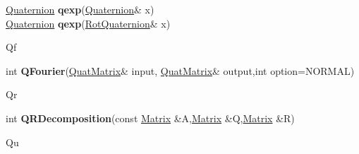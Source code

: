 \documentclass[10pt,titlepage]{article}
\def\functionlistentry#1#2#3#4#5#6{\noindent #1 {\bf #2}(#3) \dotfill #6\\}
\def\letterref#1{}
\def\letterlabel#1{\vspace{0.5cm}\centerline{\Large #1}}
\def\letterlabelend#1{}
\begin{document}
{{\letterref{Qe}
\letterref{Qf}
\letterref{Qr}
\letterref{Qu}
\letterlabelend{Qe}
\functionlistentry{\hyperlink{Quaternion}{Quaternion}}{qexp}{\hyperlink{Quaternion}{Quaternion}\& x}{1477}{quaternions}{}
\functionlistentry{\hyperlink{Quaternion}{Quaternion}}{qexp}{\hyperlink{RotQuaternion}{RotQuaternion}\& x}{1501}{quaternions}{}

\letterlabel{Qf}
\letterref{A}
\letterref{B}
\letterref{C}
\letterref{D}
\letterref{E}
\letterref{F}
\letterref{G}
\letterref{H}
\letterref{I}
\letterref{K}
\letterref{L}
\letterref{M}
\letterref{N}
\letterref{O}
\letterref{P}
\letterref{Q}
\letterref{R}
\letterref{S}
\letterref{T}
\letterref{U}
\letterref{V}
\letterref{W}
\letterref{X}
\letterref{Y}
\letterref{Z}

\letterref{Qe}
\letterref{Qf}
\letterref{Qr}
\letterref{Qu}
\letterlabelend{Qf}
\functionlistentry{int}{QFourier}{\hyperlink{QuatMatrix}{QuatMatrix}\& input, \hyperlink{QuatMatrix}{QuatMatrix}\& output,int option=NORMAL}{1540}{quaternions}{}

\letterlabel{Qr}
\letterref{A}
\letterref{B}
\letterref{C}
\letterref{D}
\letterref{E}
\letterref{F}
\letterref{G}
\letterref{H}
\letterref{I}
\letterref{K}
\letterref{L}
\letterref{M}
\letterref{N}
\letterref{O}
\letterref{P}
\letterref{Q}
\letterref{R}
\letterref{S}
\letterref{T}
\letterref{U}
\letterref{V}
\letterref{W}
\letterref{X}
\letterref{Y}
\letterref{Z}

\letterref{Qe}
\letterref{Qf}
\letterref{Qr}
\letterref{Qu}
\letterlabelend{Qr}
\functionlistentry{int}{QRDecomposition}{const \hyperlink{Matrix}{Matrix} \&A,\hyperlink{Matrix}{Matrix} \&Q,\hyperlink{Matrix}{Matrix} \&R}{1133}{matrixAlgebra}{}

\letterlabel{Qu}
\letterref{A}
\letterref{B}
\letterref{C}
\letterref{D}
\letterref{E}
\letterref{F}
\letterref{G}
\letterref{H}
\letterref{I}
\letterref{K}
\letterref{L}
\letterref{M}
\letterref{N}
\letterref{O}
\letterref{P}
\letterref{Q}
\letterref{R}
\letterref{S}
\letterref{T}
\letterref{U}
\letterref{V}
\letterref{W}
\letterref{X}
\letterref{Y}
\letterref{Z}

}}
\end{document}
